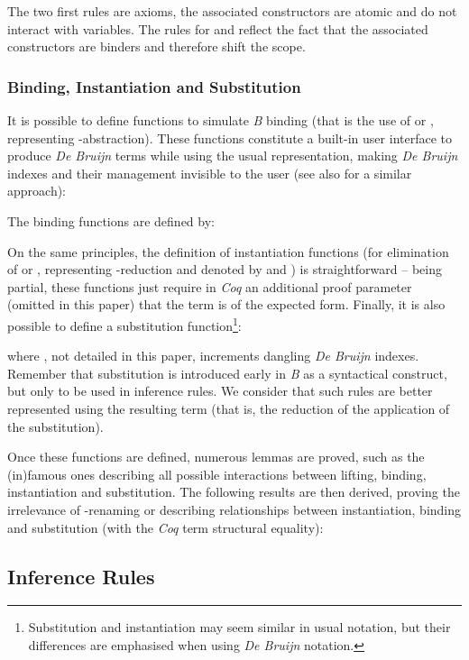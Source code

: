 \documentclass{llncs}
\begin{document}
The two first rules are axioms, the associated constructors are atomic and do not interact 
with variables. The rules for  and  reflect the fact that the associated 
constructors are binders and therefore shift the scope.

\subsubsection{Binding, Instantiation and Substitution} It is possible to define functions to 
simulate \emph{B} binding (that is the use of  or , representing 
-abstraction). These functions constitute a built-in user interface to produce 
\emph{De Bruijn} terms while using the usual representation, making \emph{De Bruijn} indexes 
and their management invisible to the user (see also \cite{gor:1} for a similar approach):

The binding functions are defined by:

On the same principles, the definition of instantiation functions (for elimination of 
 or , representing -reduction and denoted by 
 and
) is straightforward -- being partial,
these functions just require in \emph{Coq} an additional proof parameter (omitted in this 
paper) that the term is of the expected form. Finally, it is also possible to define a 
substitution function\footnote{Substitution and instantiation may seem similar in usual 
notation, but their differences are emphasised when using \emph{De Bruijn} notation.}:

where , not detailed in this paper, increments dangling \emph{De Bruijn} indexes.
Remember that substitution is introduced early in \emph{B} as a syntactical construct, but 
only to be used in inference rules. We consider that such rules are better represented using 
the resulting term (that is, the reduction of the application of the substitution).

Once these functions are defined, numerous lemmas are proved, such as the (in)famous ones 
describing all possible interactions between lifting, binding, instantiation and substitution.
The following results are then derived, proving the irrelevance of -renaming or 
describing relationships between instantiation, binding and substitution (with  the 
\emph{Coq} term structural equality):


\subsection{Inference Rules}\label{ss_infer}
\end{document}
